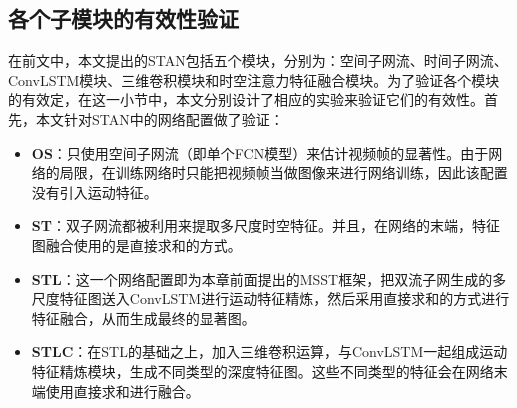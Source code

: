 \subsection{各个子模块的有效性验证}
在前文中，本文提出的STAN包括五个模块，分别为：空间子网流、时间子网流、ConvLSTM模块、三维卷积模块和时空注意力特征融合模块。为了验证各个模块的有效定，在这一小节中，本文分别设计了相应的实验来验证它们的有效性。首先，本文针对STAN中的网络配置做了验证：

\begin{itemize}
  \item \textbf{OS}：只使用空间子网流（即单个FCN模型）来估计视频帧的显著性。由于网络的局限，在训练网络时只能把视频帧当做图像来进行网络训练，因此该配置没有引入运动特征。
  \item \textbf{ST}：双子网流都被利用来提取多尺度时空特征。并且，在网络的末端，特征图融合使用的是直接求和的方式。
  \item \textbf{STL}：这一个网络配置即为本章前面提出的MSST框架，把双流子网生成的多尺度特征图送入ConvLSTM进行运动特征精炼，然后采用直接求和的方式进行特征融合，从而生成最终的显著图。
  \item \textbf{STLC}：在STL的基础之上，加入三维卷积运算，与ConvLSTM一起组成运动特征精炼模块，生成不同类型的深度特征图。这些不同类型的特征会在网络末端使用直接求和进行融合。
\end{itemize}


